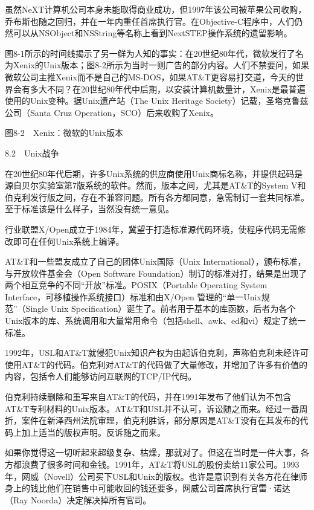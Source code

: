 \documentclass[a4paper,12pt,UTF8,twoside]{ctexbook}
\begin{document}
虽然NeXT计算机公司本身未能取得商业成功，但1997年该公司被苹果公司收购，乔布斯也随之回归，并在一年内重任首席执行官。在Objective-C程序中，人们仍然可以从NSObject和NSString等名称上看到NextSTEP操作系统的遗留影响。

图8-1所示的时间线揭示了另一鲜为人知的事实：在20世纪80年代，微软发行了名为Xenix的Unix版本；图8-2所示为当时一则广告的部分内容。人们不禁要问，如果微软公司主推Xenix而不是自己的MS-DOS，如果AT\&T更容易打交道，今天的世界会有多大不同？在20世纪80年代中后期，以安装计算机数量计，Xenix是最普遍使用的Unix变种。据Unix遗产站（The Unix Heritage Society）记载，圣塔克鲁兹公司（Santa Cruz Operation，SCO）后来收购了Xenix。



图8-2　Xenix：微软的Unix版本





8.2　Unix战争


在20世纪80年代后期，许多Unix系统的供应商使用Unix商标名称，并提供起码是源自贝尔实验室第7版系统的软件。然而，版本之间，尤其是AT\&T的System V和伯克利发行版之间，存在不兼容问题。所有各方都同意，急需制订一套共同标准。至于标准该是什么样子，当然没有统一意见。

行业联盟X/Open成立于1984年，冀望于打造标准源代码环境，使程序代码无需修改即可在任何Unix系统上编译。

AT\&T和一些盟友成立了自己的团体Unix国际（Unix International），颁布标准，与开放软件基金会（Open Software Foundation）制订的标准对打，结果是出现了两个相互竞争的不同“开放”标准。POSIX（Portable Operating System Interface，可移植操作系统接口）标准和由X/Open 管理的“单一Unix规范”（Single Unix Specification）诞生了。前者用于基本的库函数，后者为各个Unix版本的库、系统调用和大量常用命令（包括shell、awk、ed和vi）规定了统一标准。

1992年，USL和AT\&T就侵犯Unix知识产权为由起诉伯克利，声称伯克利未经许可使用AT\&T的代码。伯克利对AT\&T的代码做了大量修改，并增加了许多有价值的内容，包括令人们能够访问互联网的TCP/IP代码。

伯克利持续删除和重写来自AT\&T的代码，并在1991年发布了他们认为不包含AT\&T专利材料的Unix版本。AT\&T和USL并不认可，诉讼随之而来。经过一番周折，案件在新泽西州法院审理，伯克利胜诉，部分原因是AT\&T没有在其发布的代码上加上适当的版权声明。反诉随之而来。

如果你觉得这一切听起来超级复杂、枯燥，那就对了。但这在当时是一件大事，各方都浪费了很多时间和金钱。1991年，AT\&T将USL的股份卖给11家公司。1993年，网威（Novell）公司买下USL和Unix的版权。也许是意识到有关各方花在律师身上的钱比他们在销售中可能收回的钱还要多，网威公司首席执行官雷·诺达（Ray Noorda）决定解决掉所有官司。
\end{document}

